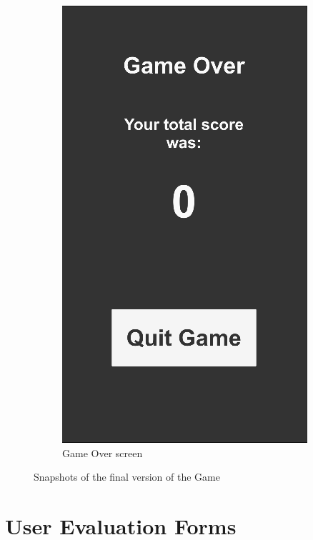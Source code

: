 \documentclass{dissertation}
\begin{document}
\begin{appendices}
\begin{figure}[H]
\begin{subfigure}[h]{.5\textwidth}
\includegraphics[width = .7\linewidth]{images/final-ui6.png}
\caption{Game Over screen}
\label{fig:f6}
\end{subfigure}
\caption{Snapshots of the final version of the Game}
\label{fig:final-deliv-game}
\end{figure}

\chapter{User Evaluation Forms}


\end{appendices}
\end{document}
